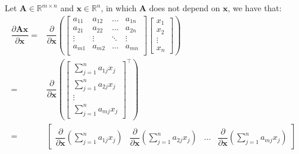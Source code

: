 \documentclass{article}
\newcommand{\trans}{\top}
\begin{document}
Let \(\mathbf{A}\in \mathbb{R}^{m\times n}\) and \(\mathbf{x} \in \mathbb{R}^{n}\), in which \(\mathbf{A}\) does not depend on \(\mathbf{x}\), we have that:
\begin{align}
    \dfrac{\partial \mathbf{A} \mathbf{x}}{\partial \mathbf{x}} = & \dfrac{\partial}{\partial \mathbf{x}} \left(
        \begin{bmatrix}
            a_{11} & a_{12} & \dots & a_{1n} \\
            a_{21} & a_{22} & \dots & a_{2n} \\
            \vdots & \vdots & \ddots & \vdots \\
            a_{m1} & a_{m2} & \dots & a_{mn} \\
        \end{bmatrix} \begin{bmatrix}
            x_{1} \\ x_{2} \\ \vdots \\ x_{n}
        \end{bmatrix} \right)  \\
    = & \dfrac{\partial}{\partial \mathbf{x}} \left(\begin{bmatrix} 
        \sum_{j = 1}^n a_{1j}x_j \\
        \sum_{j = 1}^n a_{2j}x_j \\
        \vdots \\
        \sum_{j = 1}^n a_{mj}x_j
    \end{bmatrix}^\trans \right)  \\
    = & \begin{bmatrix}
        \dfrac{\partial}{\partial \mathbf{x}}\left(\sum_{j = 1}^n {a_{1j}x_j}\right) & \dfrac{\partial}{\partial \mathbf{x}}\left(\sum_{j = 1}^n {a_{2j}x_j}\right) & \dots & \dfrac{\partial}{\partial \mathbf{x}}\left(\sum_{j = 1}^n {a_{mj}x_j}\right)
    \end{bmatrix}
\end{align}
\end{document}
